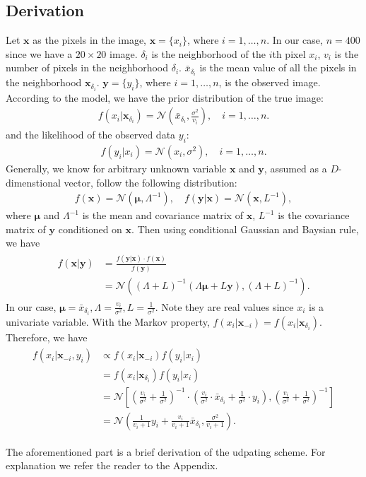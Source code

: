 \subsection{Derivation}
Let $\mathbf{x}$ as the pixels in the image, $\mathbf{x} = \{x_i\}$, where $i = 1,\dots, n$. In our case, $n=400$ since we have a $20\times 20$ image. $\delta_i$ is the neighborhood of the $i$th pixel $x_i$, $v_i$ is the number of pixels in the neighborhood $\delta_i$. $\bar{x}_{\delta_i}$ is the mean value of all the pixels in the neighborhood $\mathbf{x}_{\delta_i}$. $\mathbf{y} = \{y_i\} $, where $i = 1, \dots, n$,  is the observed image.
According to the model, we have the prior distribution of the true image:
\begin{align}
f(x_i|\mathbf{x}_{\delta_i})=\mathcal{N}\left(\bar{x}_{\delta_i}, \frac{\sigma^2}{v_i}\right),\quad i=1,\dots,n.\end{align}
and the likelihood of the observed data $y_i$: 
\begin{align}
f(y_i|x_i)= \mathcal{N}\left(x_i,\sigma^2\right),\quad i=1,\dots,n.
\end{align}
Generally, we know for arbitrary unknown variable $\mathbf{x}$ and $\mathbf{y}$, assumed as a $D$-dimenstional vector, follow the following distribution: 
\begin{align}
f(\mathbf{x})=\mathcal{N}\left(\mathbf{\mu},\Lambda^{-1}\right), \quad f(\mathbf{y}|\mathbf{x})=\mathcal{N}(\mathbf{x},L^{-1}),
\end{align}
where $\mathbf{\mu}$ and $\Lambda^{-1}$ is the mean and covariance matrix of $\mathbf{x}$, $L^{-1}$ is the covariance matrix of $\mathbf{y}$ conditioned on $\mathbf{x}$.
Then using conditional Gaussian and Baysian rule, we have
\begin{align}
\begin{split}
f(\mathbf{x}|\mathbf{y}) & = \frac{f(\mathbf{y}|\mathbf{x})\cdot f(\mathbf{x})}{f(\mathbf{y})} \\
						 & =\mathcal{N}\left((\Lambda+L)^{-1}(\Lambda{\mathbf{\mu}} + L\mathbf{y}),(\Lambda+L)^{-1}\right).
\end{split}
\end{align}
In our case, $\mathbf{\mu}=\bar{x}_{\delta_i},\Lambda=\frac{v_i}{\sigma^2}, L = \frac{1}{\sigma^2}$. Note they are real values since $x_i$ is a univariate variable.
With the Markov property, $f(x_i|\mathbf{x}_{-i}) = f(x_i|\mathbf{x}_{\delta_i})$. Therefore, we have
\begin{align}
\begin{split}
f(x_i|\mathbf{x}_{-i}, y_i) & \propto f(x_i|\mathbf{x}_{-i})f(y_i|x_i) \\
							& = f(x_i|\mathbf{x}_{\delta_i})f(y_i|x_i) \\
    & =\mathcal{N}\left[\left(\frac{v_i}{\sigma^2}+\frac{1}{\sigma^2}\right)^{-1} \cdot \left(\frac{v_i}{\sigma^2}\cdot\bar{x}_{\delta_i} + \frac{1}{\sigma^2}\cdot y_i\right),\left(\frac{v_i}{\sigma^2}+\frac{1}{\sigma^2}\right)^{-1}\right]\\
    & =\mathcal{N}\left(\frac{1}{v_i+1}y_i+\frac{v_i}{v_i+1}\bar{x}_{\delta_i},\frac{\sigma^2}{v_i+1}\right).
\end{split}
\end{align}

The aforementioned part is a brief derivation of the udpating scheme. For explanation we refer the reader to the Appendix.